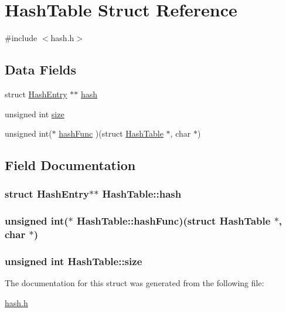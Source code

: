 \hypertarget{structHashTable}{\section{Hash\+Table Struct Reference}
\label{structHashTable}
}


{\ttfamily \#include $<$hash.\+h$>$}

\subsection*{Data Fields}
\begin{DoxyCompactItemize}
\item 
struct \hyperlink{structHashEntry}{Hash\+Entry} $\ast$$\ast$ \hyperlink{structHashTable_ae3349b8baa7e36f28dabca69043ca7ae}{hash}
\item 
unsigned int \hyperlink{structHashTable_adc33c62c4737272ec3c033cbef82612d}{size}
\item 
unsigned int($\ast$ \hyperlink{structHashTable_ad824fafe11a52e4e6a8612e9781b553d}{hash\+Func} )(struct \hyperlink{structHashTable}{Hash\+Table} $\ast$, char $\ast$)
\end{DoxyCompactItemize}


\subsection{Field Documentation}
\hypertarget{structHashTable_ae3349b8baa7e36f28dabca69043ca7ae}{
\subsubsection[{hash}]{\setlength{\rightskip}{0pt plus 5cm}struct {\bf Hash\+Entry}$\ast$$\ast$ Hash\+Table\+::hash}}\label{structHashTable_ae3349b8baa7e36f28dabca69043ca7ae}
\hypertarget{structHashTable_ad824fafe11a52e4e6a8612e9781b553d}{
\subsubsection[{hash\+Func}]{\setlength{\rightskip}{0pt plus 5cm}unsigned int($\ast$  Hash\+Table\+::hash\+Func)(struct {\bf Hash\+Table} $\ast$, char $\ast$)}}\label{structHashTable_ad824fafe11a52e4e6a8612e9781b553d}
\hypertarget{structHashTable_adc33c62c4737272ec3c033cbef82612d}{
\subsubsection[{size}]{\setlength{\rightskip}{0pt plus 5cm}unsigned int Hash\+Table\+::size}}\label{structHashTable_adc33c62c4737272ec3c033cbef82612d}


The documentation for this struct was generated from the following file\+:\begin{DoxyCompactItemize}
\item 
\hyperlink{hash_8h}{hash.\+h}\end{DoxyCompactItemize}
